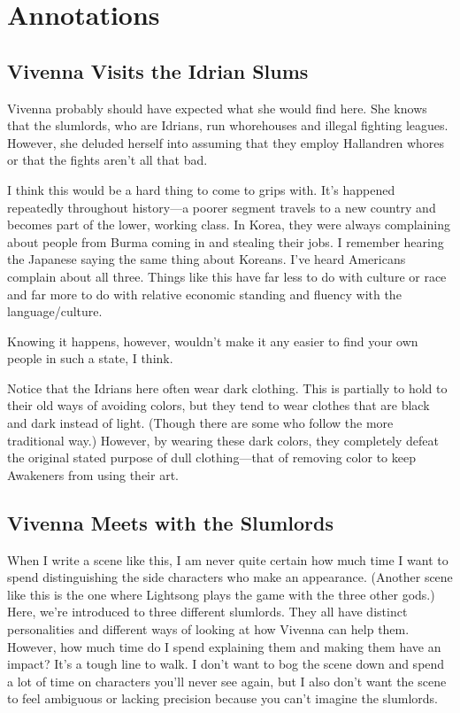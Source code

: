 \section*{Annotations}

\subsection*{Vivenna Visits the Idrian Slums}

Vivenna probably should have expected what she would find here. She knows that the slumlords, who are Idrians, run whorehouses and illegal fighting leagues. However, she deluded herself into assuming that they employ Hallandren whores or that the fights aren’t all that bad.

I think this would be a hard thing to come to grips with. It’s happened repeatedly throughout history—a poorer segment travels to a new country and becomes part of the lower, working class. In Korea, they were always complaining about people from Burma coming in and stealing their jobs. I remember hearing the Japanese saying the same thing about Koreans. I’ve heard Americans complain about all three. Things like this have far less to do with culture or race and far more to do with relative economic standing and fluency with the language/culture.

Knowing it happens, however, wouldn’t make it any easier to find your own people in such a state, I think.

Notice that the Idrians here often wear dark clothing. This is partially to hold to their old ways of avoiding colors, but they tend to wear clothes that are black and dark instead of light. (Though there are some who follow the more traditional way.) However, by wearing these dark colors, they completely defeat the original stated purpose of dull clothing—that of removing color to keep Awakeners from using their art.

\subsection*{Vivenna Meets with the Slumlords}

When I write a scene like this, I am never quite certain how much time I want to spend distinguishing the side characters who make an appearance. (Another scene like this is the one where Lightsong plays the game with the three other gods.) Here, we’re introduced to three different slumlords. They all have distinct personalities and different ways of looking at how Vivenna can help them. However, how much time do I spend explaining them and making them have an impact? It’s a tough line to walk. I don’t want to bog the scene down and spend a lot of time on characters you’ll never see again, but I also don’t want the scene to feel ambiguous or lacking precision because you can’t imagine the slumlords.

